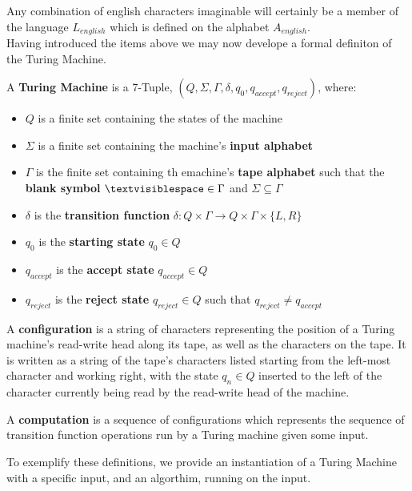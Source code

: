 \documentclass{article}
\begin{document}
\noindent Any combination of english characters imaginable will certainly be a member of the language $L_{english}$ which is defined on the alphabet $A_{english}$.\\

\noindent Having introduced the items above we may now develope a formal definiton of the Turing Machine.

\begin{defin}
	A \textbf{Turing Machine} is a 7-Tuple, $(Q, \Sigma, \Gamma, \delta, q_{0}, q_{accept}, q_{reject})$, where:
\end{defin}
\begin{itemize}
	\item $Q$ is a finite set containing the states of the machine
	\item $\Sigma$ is a finite set containing the machine's \textbf{input alphabet}
	\item $\Gamma$ is the finite set containing th emachine's \textbf{tape alphabet} such that the \textbf{blank symbol} $\textvisiblespace \in \Gamma$ and $\Sigma \subseteq \Gamma$
	\item $\delta$ is the \textbf{transition function} $\delta: Q \times \Gamma \to Q \times \Gamma \times \{L, R\}$
	\item $q_{0}$ is the \textbf{starting state} $q_{0} \in Q$
	\item $q_{accept}$ is the \textbf{accept state} $q_{accept} \in Q$
	\item $q_{reject}$ is the \textbf{reject state} $q_{reject} \in Q$ such that $q_{reject} \neq q_{accept}$ \cite{2}
\end{itemize}
\begin{defin}
	A \textbf{configuration} is a string of characters representing the position of a Turing machine's read-write head along its tape, as well as the characters on the tape.  It is written as a string of the tape's characters listed starting from the left-most character and working right, with the state $q_{n} \in Q$ inserted to the left of the character currently being read by the read-write head of the machine.
\end{defin}
\begin{defin}
	A \textbf{computation} is a sequence of configurations which represents the sequence of transition function operations run by a Turing machine given some input. \cite{6}
\end{defin}
\noindent To exemplify these definitions, we provide an instantiation of a Turing Machine with a specific input, and an algorthim, running on the input.
\end{document}
